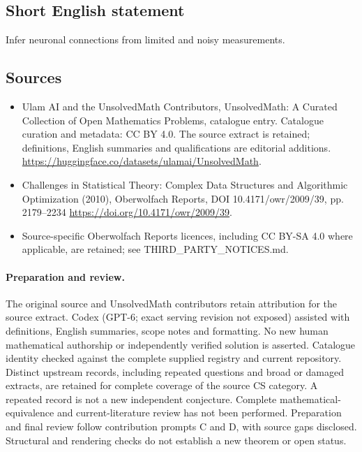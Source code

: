 \documentclass[11pt]{article}
\begin{document}
\subsection{Short English statement}
Infer neuronal connections from limited and noisy measurements.
\subsection{Sources}
\begin{itemize}
\item[\hypertarget{source:statement:1}{S1}] Ulam AI and the UnsolvedMath Contributors, UnsolvedMath: A Curated Collection of Open Mathematics Problems, catalogue entry. Catalogue curation and metadata: CC BY 4.0. The source extract is retained; definitions, English summaries and qualifications are editorial additions.
\url{https://huggingface.co/datasets/ulamai/UnsolvedMath}.
\item[\hypertarget{source:statement:2}{S2}] Challenges in Statistical Theory: Complex Data Structures and Algorithmic Optimization (2010), Oberwolfach Reports, DOI 10.4171/owr/2009/39, pp. 2179--2234
\url{https://doi.org/10.4171/owr/2009/39}.
\item Source-specific Oberwolfach Reports licences, including CC BY-SA 4.0 where applicable, are retained; see THIRD\_PARTY\_NOTICES.md.
\end{itemize}
\paragraph{Preparation and review.}
The original source and UnsolvedMath contributors retain attribution for the source extract. Codex (GPT-6; exact serving revision not exposed) assisted with definitions, English summaries, scope notes and formatting. No new human mathematical authorship or independently verified solution is asserted. Catalogue identity checked against the complete supplied registry and current repository. Distinct upstream records, including repeated questions and broad or damaged extracts, are retained for complete coverage of the source CS category. A repeated record is not a new independent conjecture. Complete mathematical-equivalence and current-literature review has not been performed. Preparation and final review follow contribution prompts C and D, with source gaps disclosed. Structural and rendering checks do not establish a new theorem or open status.
\label{end:statement}
\end{document}
